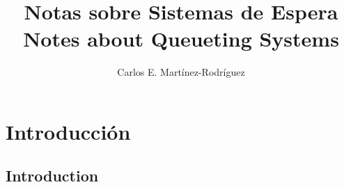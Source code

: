 \documentclass{article}
\title{Notas sobre Sistemas de Espera\\
\small{Notes about Queueting Systems}}
\author{Carlos E. Martínez-Rodríguez}
\date{}
\renewcommand{\abstractname}{Resumen}
\numberwithin{equation}{section}
\begin{document}
\maketitle

\begin{abstract}

\end{abstract}

\begin{otherlanguage}{english}
\renewcommand{\abstractname}{Abstract} %
\begin{abstract}

\end{abstract}
\end{otherlanguage}

\tableofcontents

\section*{Introducción}



\begin{otherlanguage}{english}
\renewcommand{\abstractname}{Abstract} %
\section*{Introduction}


\end{otherlanguage}

\end{document}
